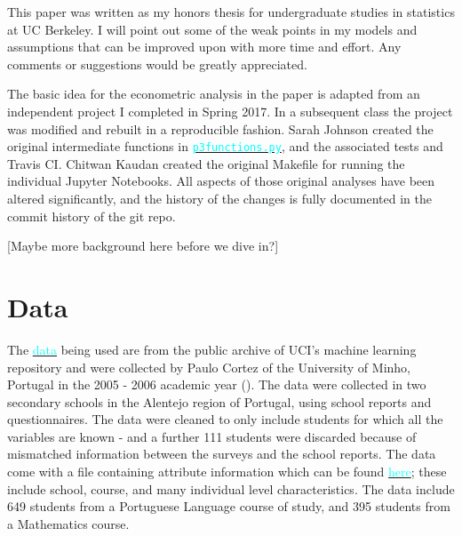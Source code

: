 \documentclass[12pt]{article}
\newcommand{\inlinecode}{\texttt}
\begin{document}
This paper was written as my honors thesis for undergraduate studies in statistics at UC Berkeley. I will point out some of the weak points in my models and assumptions that can be improved upon with more time and effort. Any comments or suggestions would be greatly appreciated. 

The basic idea for the econometric analysis in the paper is adapted from an independent project I completed in Spring 2017. In a subsequent class the project was modified and rebuilt in a reproducible fashion. Sarah Johnson created the original intermediate functions in \href{https://github.com/nadavtadelis/Reproducible_Metrics/blob/master/p3functions.py}{\textcolor{cyan}{\inlinecode{p3functions.py}}}, and the associated tests and Travis CI. Chitwan Kaudan created the original Makefile for running the individual Jupyter Notebooks. All aspects of those original analyses have been altered significantly, and the history of the changes is fully documented in the commit history of the git repo.

\textcolor{BrickRed}{[Maybe more background here before we dive in?]}


\newpage
\section{Data}
The \href{https://archive.ics.uci.edu/ml/datasets/Student+Performance#}{\textcolor{cyan}{data}} being used are from the public archive of UCI's machine learning repository and were collected by Paulo Cortez of the University of Minho, Portugal in the 2005 - 2006 academic year (\cite{data_paper}). The data were collected in two secondary schools in the Alentejo region of Portugal, using school reports and questionnaires. The data were cleaned to only include students for which all the variables are known - and a further 111 students were discarded because of mismatched information between the surveys and the school reports. The data come with a file containing attribute information which can be found \href{https://archive.ics.uci.edu/ml/datasets/Student+Performance#}{\textcolor{cyan}{here}}; these include school, course, and many individual level characteristics. The data include 649 students from a Portuguese Language course of study, and 395 students from a Mathematics course.

\end{document}
